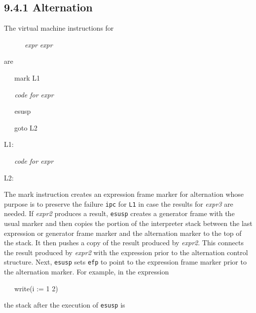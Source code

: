 \subsection[9.4.1 Alternation]{9.4.1 Alternation}

The virtual machine instructions for

{\ttfamily\mdseries
\ \ \ \ \ \ \textit{expr} {\textbar} \textit{expr}}

are

{\ttfamily\mdseries
\ \ \ mark L1}

{\ttfamily\itshape
\ \ \ code for expr}


\textit{\ \ \ }esusp

{\ttfamily\mdseries
\ \ \ goto L2}

{\ttfamily\mdseries
L1:}

{\ttfamily\mdseries
\ \ \ \textit{code for expr}\textit{}}

{\ttfamily\mdseries
L2:}


The mark instruction creates an expression frame marker for
alternation whose purpose is to preserve the failure \texttt{ipc} for
\texttt{L1} in case the results for \textit{expr3 }are needed. If
\textit{expr2 }produces a result, \texttt{esusp} creates a generator
frame with the usual marker and then copies the portion of the
interpreter stack between the last expression or generator frame
marker and the alternation marker to the top of the stack. It then
pushes a copy of the result produced by \textit{expr2}. This connects
the result produced by \textit{expr2 }with the expression prior to the
alternation control structure. Next, \texttt{esusp} sets \texttt{efp}
to point to the expression frame marker prior to the alternation
marker. For example, in the expression

{\ttfamily\mdseries
\ \ \ write(i := 1 {\textbar} 2)}

\noindent the stack after the execution of \texttt{esusp} is


